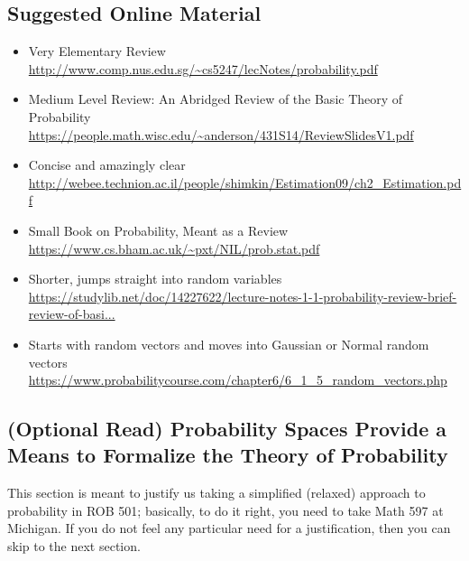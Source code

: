 \subsection{Suggested Online Material}

\begin{itemize}
\item Very Elementary Review \\
{\small  \url{http://www.comp.nus.edu.sg/~cs5247/lecNotes/probability.pdf}}
\item  Medium Level Review: An Abridged Review of the Basic Theory of Probability  \\
{\small  \url{https://people.math.wisc.edu/~anderson/431S14/ReviewSlidesV1.pdf}}
\item  Concise and amazingly clear \\ {\small  \url{http://webee.technion.ac.il/people/shimkin/Estimation09/ch2_Estimation.pdf}}
\item Small Book on Probability, Meant as a Review\\
{\small  \url{https://www.cs.bham.ac.uk/~pxt/NIL/prob.stat.pdf}}
\item Shorter, jumps straight into random variables\\
{\small  \url{https://studylib.net/doc/14227622/lecture-notes-1-1-probability-review-brief-review-of-basi...}}

\item Starts with random vectors and moves into Gaussian or Normal random vectors\\
{\small \url{https://www.probabilitycourse.com/chapter6/6_1_5_random_vectors.php}}
\end{itemize}

   \subsection{(Optional Read) Probability Spaces Provide a Means to Formalize the Theory of Probability}
   \label{sec:ProbableApology}

This section is meant to justify us taking a simplified (relaxed) approach to probability in ROB 501; basically, to do it right, you need to take Math 597 at Michigan. If you do not feel any particular need for a justification, then you can skip to the next section. 
    

